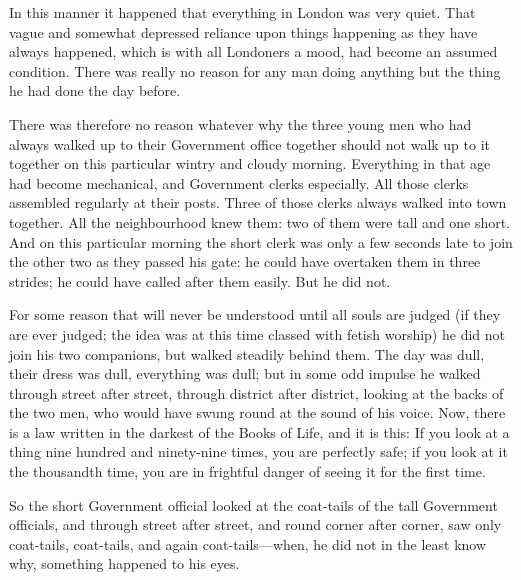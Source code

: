 \documentclass{book}
\begin{document}
In this manner it happened that everything in London was very quiet. That vague and somewhat depressed reliance upon things happening as they have always happened, which is with all Londoners a mood, had become an assumed condition. There was really no reason for any man doing anything but the thing he had done the day before.

There was therefore no reason whatever why the three young men who had always walked up to their Government office together should not walk up to it together on this particular wintry and cloudy morning. Everything in that age had become mechanical, and Government clerks especially. All those clerks assembled regularly at their posts. Three of those clerks always walked into town together. All the neighbourhood knew them: two of them were tall and one short. And on this particular morning the short clerk was only a few seconds late to join the other two as they passed his gate: he could have overtaken them in three strides; he could have called after them easily. But he did not.

For some reason that will never be understood until all souls are judged (if they are ever judged; the idea was at this time classed with fetish worship) he did not join his two companions, but walked steadily behind them. The day was dull, their dress was dull, everything was dull; but in some odd impulse he walked through street after street, through district after district, looking at the backs of the two men, who would have swung round at the sound of his voice. Now, there is a law written in the darkest of the Books of Life, and it is this: If you look at a thing nine hundred and ninety-nine times, you are perfectly safe; if you look at it the thousandth time, you are in frightful danger of seeing it for the first time.

So the short Government official looked at the coat-tails of the tall Government officials, and through street after street, and round corner after corner, saw only coat-tails, coat-tails, and again coat-tails—when, he did not in the least know why, something happened to his eyes.
\end{document}
